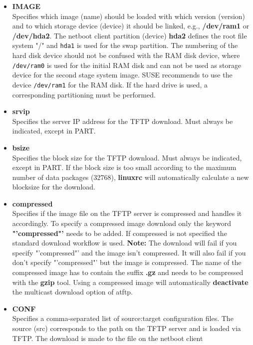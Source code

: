 \begin{itemize}
	\item \textbf{IMAGE}\\
		Specifies which image (name) should be loaded with which
		version (version) and to which storage device (device) it
		should be linked, e.g., \textbf{/dev/ram1} or
		\textbf{/dev/hda2}. The netboot client partition (device)
		\textbf{hda2} defines the root file system "/" and \texttt{hda1}
		is used for the swap partition. The numbering of the hard disk
		device should not be confused with the RAM disk device,
		where \texttt{/dev/ram0} is used for the initial RAM disk and
		can not be used as storage device for the second stage system image.
		SUSE recommends to use the device \texttt{/dev/ram1} for the
		RAM disk. If the hard drive is used, a corresponding partitioning
		must be performed.
	\item \textbf{srvip}\\
		Specifies the server IP address for the TFTP download.
		Must always be indicated, except in PART.
	\item \textbf{bsize}\\
		Specifies the block size for the TFTP download. Must always
		be indicated, except in PART. If the block size is too small
		according to the maximum number of data packages (32768),
		\textbf{linuxrc} will automatically calculate a new blocksize for
		the download.
    \item \textbf{compressed}\\
        Specifies if the image file on the TFTP server is compressed and
        handles it accordingly. To specify a compressed image download only
        the keyword \textbf{"'compressed"'} needs to be added. If compressed
        is not specified the standard download workflow is used. \textbf{Note:}
        The download will fail if you specify "'compressed"' and the image isn't
        compressed. It will also fail if you don't specify "'compressed"'
        but the image is compressed. The name of the compressed image has
        to contain the suffix \textbf{.gz} and needs to be compressed with the
        \textbf{gzip} tool. Using a compressed image will automatically
        \textbf{deactivate} the multicast download option of atftp.
	\item \textbf{CONF}\\
		Specifies a comma-separated list of source:target
		configuration files. The source (src) corresponds to the path
		on the TFTP server and is loaded via TFTP. The
		download is made to the file on the netboot client

\end{itemize}
